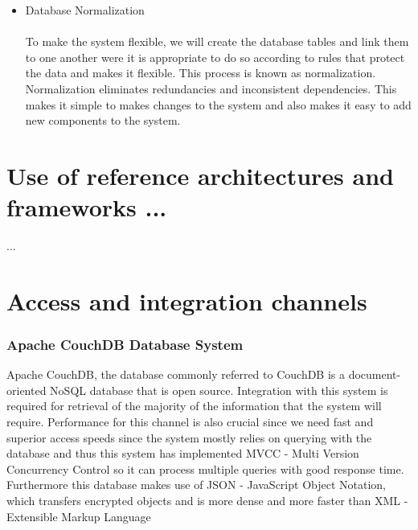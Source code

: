 \documentclass[a4paper]{article}
\begin{document}
\begin{itemize}
		\\
		\item Database Normalization \\\\
		To make the system flexible, we will create the database tables and link them to one another were it is appropriate to do so according to rules that protect the data and makes it flexible. This process is known as normalization. Normalization eliminates redundancies and inconsistent dependencies. This makes it simple to makes changes to the system and also makes it easy to add new components to the system.
		\\
	\end{itemize}
	\section{Use of reference architectures and frameworks ...}
	...\\ 
	\section{Access and integration channels}
	\subsubsection{Apache CouchDB Database System}
	Apache CouchDB, the database commonly referred to CouchDB is a document-oriented NoSQL database that is open source. Integration with this system is required for retrieval of the majority of the information that the system will require. Performance for this channel is also crucial since we need fast and superior access speeds since the system mostly relies on querying with the database and thus this system has implemented MVCC - Multi Version Concurrency Control so it can process multiple queries with good response time. Furthermore this database makes use of JSON - JavaScript Object Notation, which transfers encrypted objects and is more dense and more faster than XML - Extensible Markup Language
	
\end{document}
